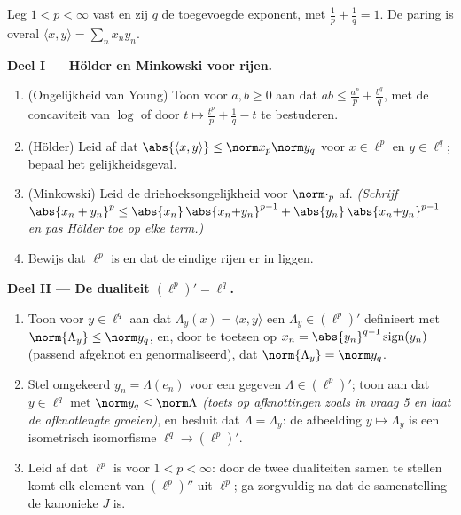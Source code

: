 \begin{problem}[{Weekendopgave --- $(\ell^p)' = \ell^q$,
reflexiviteit, en het vreemde van $\ell^\infty$}]
\label{pb:b3:banach:1}
Leg $1 < p < \infty$ vast en zij $q$ de toegevoegde exponent, met
$\frac1p + \frac1q = 1$. De paring is overal $\langle x, y\rangle
= \sum_n x_ny_n$.

\medskip
\noindent\textbf{Deel I --- Hölder en Minkowski voor rijen.}
\begin{enumerate}
  \item (Ongelijkheid van Young) Toon voor $a, b \geq 0$ aan dat
        $ab \leq \frac{a^p}p + \frac{b^q}q$, met de concaviteit
        van $\log$ of door $t \mapsto \frac{t^p}p + \frac1q - t$
        te bestuderen.
  \item (Hölder) Leid af dat $\abs{\langle x, y\rangle} \leq
        \norm x_p\norm y_q$ voor $x \in \ell^p$ en $y \in \ell^q$;
        bepaal het gelijkheidsgeval.
  \item (Minkowski) Leid de driehoeksongelijkheid voor
        $\norm\cdot_p$ af. \emph{(Schrijf $\abs{x_n + y_n}^p \leq
        \abs{x_n}\,\abs{x_n{+}y_n}^{p-1} +
        \abs{y_n}\,\abs{x_n{+}y_n}^{p-1}$ en pas Hölder toe op
        elke term.)}
  \item Bewijs dat $\ell^p$  is en dat de eindige rijen er
         in liggen.
\end{enumerate}

\medskip
\noindent\textbf{Deel II --- De dualiteit $(\ell^p)' =
\ell^q$.}
\begin{enumerate}[resume]
  \item Toon voor $y \in \ell^q$ aan dat $\Lambda_y(x) = \langle
        x, y\rangle$ een $\Lambda_y \in (\ell^p)'$ definieert met
        $\norm{\Lambda_y} \leq \norm y_q$, en, door te toetsen op
        $x_n = \abs{y_n}^{q-1}\operatorname{sign}(y_n)$ (passend
        afgeknot en genormaliseerd), dat $\norm{\Lambda_y} = \norm
        y_q$.
  \item Stel omgekeerd $y_n = \Lambda(e_n)$ voor een gegeven
        $\Lambda \in (\ell^p)'$; toon aan dat $y \in \ell^q$ met
        $\norm y_q \leq \norm\Lambda$ \emph{(toets op afknottingen
        zoals in vraag 5 en laat de afknotlengte groeien)}, en
        besluit dat $\Lambda = \Lambda_y$: de afbeelding $y
        \mapsto \Lambda_y$ is een isometrisch isomorfisme $\ell^q
        \to (\ell^p)'$.
  \item Leid af dat $\ell^p$ \emph{} is voor $1 < p <
        \infty$: door de twee dualiteiten samen te stellen komt
        elk element van $(\ell^p)''$ uit $\ell^p$; ga zorgvuldig
        na dat de samenstelling de kanonieke $J$ is.
\end{enumerate}


\end{problem}
